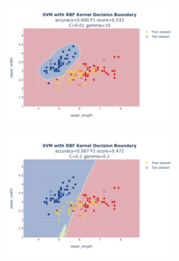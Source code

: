\documentclass{article}
\begin{document}
\begin{figure}
\begin{subfigure}{0.3\textwidth}
        \includegraphics[scale=.13]{images/implementation/q1/rbf_kernel/sepal_length_sepal_width_0.01_10.png}
    \end{subfigure}
    \newline
    \begin{subfigure}{0.3\textwidth}
        \centering
        \includegraphics[scale=.13]{images/implementation/q1/rbf_kernel/sepal_length_sepal_width_0.1_0.1.png}
    \end{subfigure}
    \hfill
    \begin{subfigure}{0.3\textwidth}
        \centering

\end{subfigure}
\end{figure}
\end{document}
